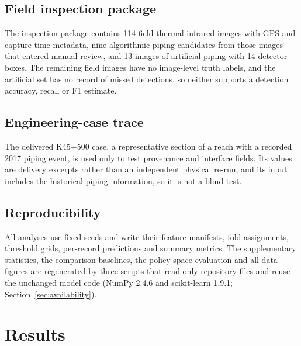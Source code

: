 \documentclass[journal]{IEEEtran}
\begin{document}
\subsection{Field inspection package}
The inspection package contains 114 field thermal infrared images with GPS and capture-time metadata, nine algorithmic piping candidates from those images that entered manual review, and 13 images of artificial piping with 14 detector boxes. The remaining field images have no image-level truth labels, and the artificial set has no record of missed detections, so neither supports a detection accuracy, recall or F1 estimate.

\subsection{Engineering-case trace}
The delivered K45+500 case, a representative section of a reach with a recorded 2017 piping event, is used only to test provenance and interface fields. Its values are delivery excerpts rather than an independent physical re-run, and its input includes the historical piping information, so it is not a blind test.

\subsection{Reproducibility}
All analyses use fixed seeds and write their feature manifests, fold assignments, threshold grids, per-record predictions and summary metrics. The supplementary statistics, the comparison baselines, the policy-space evaluation and all data figures are regenerated by three scripts that read only repository files and reuse the unchanged model code (NumPy 2.4.6 and scikit-learn 1.9.1; Section~\ref{sec:availability}).

\section{Results}
\label{sec:results}
\end{document}
